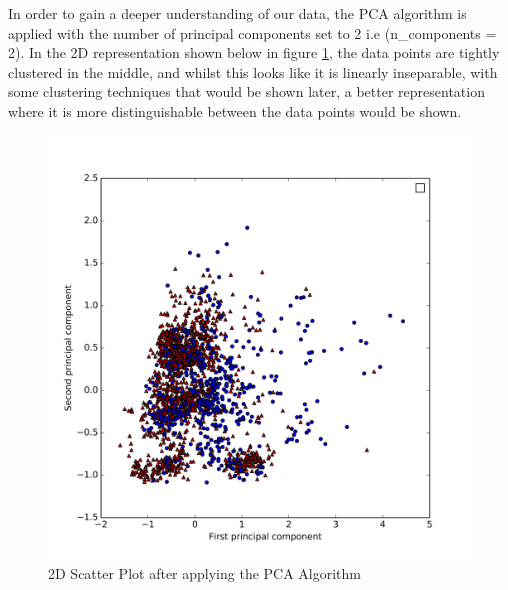 \documentclass[a4paper,12pt]{report}
\begin{document}
		In order to gain a deeper understanding of our data, the PCA algorithm is applied with the number of principal components set to 2 i.e (n\_components = 2). In the 2D representation shown below in figure \ref{fig:scatter_pca_2D}, the data points are tightly clustered in the middle, and whilst this looks like it is linearly inseparable, with some clustering techniques that would be shown later, a better representation where it is more distinguishable between the data points would be shown.
		\begin{figure}[H]
			\centering
			\includegraphics[width=\textwidth,scale=1,totalheight=0.5\textheight]{images/scatter_pca}
			\caption{2D Scatter Plot after applying the PCA Algorithm}
			\label{fig:scatter_pca_2D}
		\end{figure}
	
\end{document}
